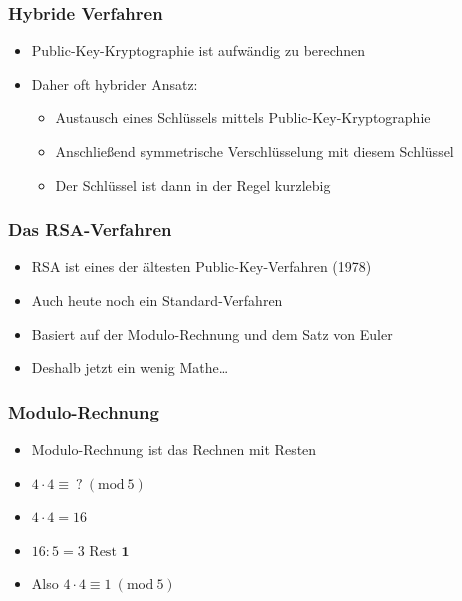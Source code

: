 \documentclass{beamer}
\begin{document}
\begin{frame}
\frametitle{Hybride Verfahren}

\begin{itemize}
	\item Public-Key-Kryptographie ist aufwändig zu berechnen
	\item Daher oft hybrider Ansatz:
	\begin{itemize}
		\item Austausch eines Schlüssels mittels Public-Key-Kryptographie
		\item Anschließend symmetrische Verschlüsselung mit diesem Schlüssel
		\item Der Schlüssel ist dann in der Regel kurzlebig
	\end{itemize}
\end{itemize}
\end{frame}

\begin{frame}
\frametitle{Das RSA-Verfahren}

	\begin{itemize}
		\item RSA ist eines der ältesten Public-Key-Verfahren (1978)
		\item Auch heute noch ein Standard-Verfahren
		\item Basiert auf der Modulo-Rechnung und dem Satz von Euler
		\item Deshalb jetzt ein wenig Mathe\dots
	\end{itemize}
\end{frame}

\begin{frame}
\frametitle{Modulo-Rechnung}
	\begin{itemize}
		\item Modulo-Rechnung ist das Rechnen mit Resten
		\item \(4 \cdot 4 \equiv \ ?\ (\text{mod}\ 5) \)
\pause		\item \(4 \cdot 4 = 16\)
\pause		\item \(16 : 5 = 3 \text{ Rest } \textbf{1}\)
\pause		\item Also \(4 \cdot 4 \equiv 1\ (\text{mod}\ 5) \)
	\end{itemize}
\end{frame}
\end{document}
